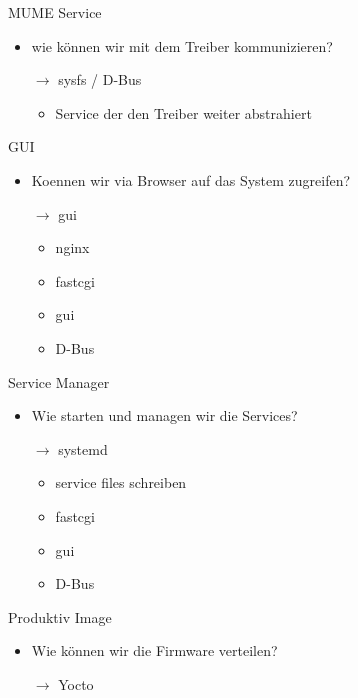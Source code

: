 \begin{frame}{MUME Service}
	\begin{itemize}
		\item wie können wir mit dem Treiber kommunizieren?
		\item[$\rightarrow$] sysfs / D-Bus
		\begin{itemize}
			\item Service der den Treiber weiter abstrahiert
		\end{itemize}
	\end{itemize}
\end{frame}

\begin{frame}{GUI}
	\begin{itemize}
		\item Koennen wir via Browser auf das System zugreifen?
		\item[$\rightarrow$] gui
		\begin{itemize}
			\item nginx
			\item fastcgi
			\item gui
			\item D-Bus
		\end{itemize}
	\end{itemize}
\end{frame}

\begin{frame}{Service Manager}
	\begin{itemize}
		\item Wie starten und managen wir die Services?
		\item[$\rightarrow$] systemd
		\begin{itemize}
			\item service files schreiben
			\item fastcgi
			\item gui
			\item D-Bus
		\end{itemize}
	\end{itemize}
\end{frame}

\begin{frame}{Produktiv Image}
	\begin{itemize}
		\item Wie können wir die Firmware verteilen?
		\item[$\rightarrow$] Yocto
	\end{itemize}
\end{frame}







